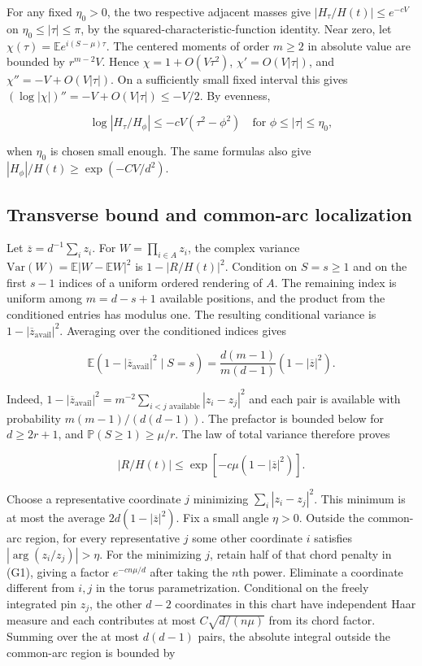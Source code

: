 For any fixed $\eta_0>0$, the two respective adjacent masses give $|H_\tau/H(t)|\le e^{-cV}$ on $\eta_0\le|\tau|\le\pi$, by the squared-characteristic-function identity. Near zero, let $\chi(\tau)=\mathbb E e^{i(S-\mu)\tau}$. The centered moments of order $m\ge2$ in absolute value are bounded by $r^{m-2}V$. Hence $\chi=1+O(V\tau^2)$, $\chi'=O(V|\tau|)$, and $\chi''=-V+O(V|\tau|)$. On a sufficiently small fixed interval this gives $(\log|\chi|)''=-V+O(V|\tau|)\le -V/2$. By evenness,

\begin{equation*}
\log|H_\tau/H_\phi|\le -cV(\tau^2-\phi^2)
\quad\text{for }\phi\le|\tau|\le\eta_0,
\end{equation*}

when $\eta_0$ is chosen small enough. The same formulas also give $|H_\phi|/H(t)\ge \exp(-CV/d^2)$.

\subsection{Transverse bound and common-arc localization}

Let $\overline z=d^{-1}\sum_i z_i$. For $W=\prod_{i\in A}z_i$, the complex variance $\mathrm{Var}(W)=\mathbb E|W-\mathbb E W|^2$ is $1-|R/H(t)|^2$. Condition on $S=s\ge1$ and on the first $s-1$ indices of a uniform ordered rendering of $A$. The remaining index is uniform among $m=d-s+1$ available positions, and the product from the conditioned entries has modulus one. The resulting conditional variance is $1-|\overline z_{\mathrm{avail}}|^2$. Averaging over the conditioned indices gives

\begin{equation*}
\mathbb E(1-|\overline z_{\mathrm{avail}}|^2\mid S=s)
=\frac{d(m-1)}{m(d-1)}(1-|\overline z|^2).
\end{equation*}

Indeed, $1-|\overline z_{\mathrm{avail}}|^2=m^{-2}\sum_{i<j\text{ available}}|z_i-z_j|^2$ and each pair is available with probability $m(m-1)/(d(d-1))$. The prefactor is bounded below for $d\ge2r+1$, and $\mathbb P(S\ge1)\ge\mu/r$. The law of total variance therefore proves

\begin{equation}
|R/H(t)|\le \exp[-c\mu(1-|\overline z|^2)].
\tag{G1}
\end{equation}

Choose a representative coordinate $j$ minimizing $\sum_i|z_i-z_j|^2$. This minimum is at most the average $2d(1-|\overline z|^2)$. Fix a small angle $\eta>0$. Outside the common-arc region, for every representative $j$ some other coordinate $i$ satisfies $|\arg(z_i/z_j)|>\eta$. For the minimizing $j$, retain half of that chord penalty in (G1), giving a factor $e^{-c n\mu/d}$ after taking the $n$th power. Eliminate a coordinate different from $i,j$ in the torus parametrization. Conditional on the freely integrated pin $z_j$, the other $d-2$ coordinates in this chart have independent Haar measure and each contributes at most $C\sqrt{d/(n\mu)}$ from its chord factor. Summing over the at most $d(d-1)$ pairs, the absolute integral outside the common-arc region is bounded by

